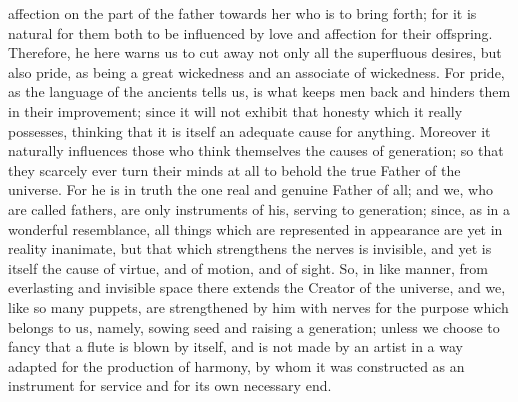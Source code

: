affection on the part of the father towards her who is to bring forth; for it is natural for them both to
be influenced by love and affection for their offspring. Therefore, he here warns us to cut away not
only all the superfluous desires, but also pride, as being a great wickedness and an associate of
wickedness. For pride, as the language of the ancients tells us, is what keeps men back and
hinders them in their improvement; since it will not exhibit that honesty which it really possesses,
thinking that it is itself an adequate cause for anything. Moreover it naturally influences those who
think themselves the causes of generation; so that they scarcely ever turn their minds at all to
behold the true Father of the universe. For he is in truth the one real and genuine Father of all; and
we, who are called fathers, are only instruments of his, serving to generation; since, as in a
wonderful resemblance, all things which are represented in appearance are yet in reality inanimate,
but that which strengthens the nerves is invisible, and yet is itself the cause of virtue, and of
motion, and of sight. So, in like manner, from everlasting and invisible space there extends the
Creator of the universe, and we, like so many puppets, are strengthened by him with nerves for the
purpose which belongs to us, namely, sowing seed and raising a generation; unless we choose to
fancy that a flute is blown by itself, and is not made by an artist in a way adapted for the production
of harmony, by whom it was constructed as an instrument for service and for its own necessary
end.

